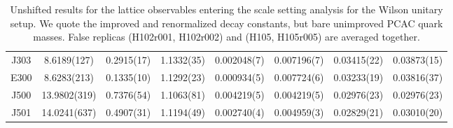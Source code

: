 \begin{sidewaystable}
\begin{center}
\begin{tabular}{c c c c c c c c}
J303 & 8.6189(127) & 0.2915(17) & 1.1332(35) & 0.002048(7) & 0.007196(7) & 0.03415(22) & 0.03873(15) \\
E300 & 8.6283(213) & 0.1335(10) & 1.1292(23) & 0.000934(5) & 0.007724(6) & 0.03233(19) & 0.03816(37) \\
\midrule
J500 & 13.9802(319) & 0.7376(54) & 1.1063(81) & 0.004219(5) & 0.004219(5) & 0.02976(23) & 0.02976(23) \\
J501 & 14.0241(637) & 0.4907(31) & 1.1194(49) & 0.002740(4) & 0.004959(3) & 0.02829(21) & 0.03010(20) \\
\bottomrule
    \end{tabular}
    \end{center}
    \caption{Unshifted results for the lattice observables entering the scale setting analysis for the Wilson unitary setup. We quote the improved and renormalized decay constants, but bare unimproved PCAC quark masses. False replicas (H102r001, H102r002) and (H105, H105r005) are averaged together.}
\label{apex_ensembles:tab:obs_w}
\end{sidewaystable}

\newpage

